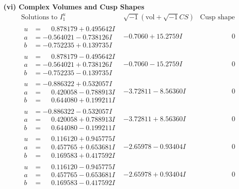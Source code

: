 \documentclass[1p]{elsarticle_modified}
\theoremstyle{definition}
\newcommand{\I}{\sqrt{-1}}
\begin{document}
\newpage\flushleft \textbf{(vi) Complex Volumes and Cusp Shapes}
$$\begin{array}{c|c|c}  
\text{Solutions to }I^u_{1}& \I (\text{vol} + \sqrt{-1}CS) & \text{Cusp shape}\\
 \hline 
\begin{aligned}
u &= \phantom{-}0.878179 + 0.495642 I \\
a &= -0.564021 - 0.738126 I \\
b &= -0.752235 + 0.139735 I\end{aligned}
 & -0.7060 + 15.2759 I & \phantom{-0.000000 } 0 \\ \hline\begin{aligned}
u &= \phantom{-}0.878179 - 0.495642 I \\
a &= -0.564021 + 0.738126 I \\
b &= -0.752235 - 0.139735 I\end{aligned}
 & -0.7060 - 15.2759 I & \phantom{-0.000000 } 0 \\ \hline\begin{aligned}
u &= -0.886322 + 0.532057 I \\
a &= \phantom{-}0.420058 - 0.788913 I \\
b &= \phantom{-}0.644080 + 0.199211 I\end{aligned}
 & -3.72811 - 8.56360 I & \phantom{-0.000000 } 0 \\ \hline\begin{aligned}
u &= -0.886322 - 0.532057 I \\
a &= \phantom{-}0.420058 + 0.788913 I \\
b &= \phantom{-}0.644080 - 0.199211 I\end{aligned}
 & -3.72811 + 8.56360 I & \phantom{-0.000000 } 0 \\ \hline\begin{aligned}
u &= \phantom{-}0.116120 + 0.945775 I \\
a &= \phantom{-}0.457765 + 0.653681 I \\
b &= \phantom{-}0.169583 + 0.417592 I\end{aligned}
 & -2.65978 - 0.93404 I & \phantom{-0.000000 } 0 \\ \hline\begin{aligned}
u &= \phantom{-}0.116120 - 0.945775 I \\
a &= \phantom{-}0.457765 - 0.653681 I \\
b &= \phantom{-}0.169583 - 0.417592 I\end{aligned}
 & -2.65978 + 0.93404 I & \phantom{-0.000000 } 0 \\ \hline\begin{aligned}

\end{aligned}
\end{array}$$
\end{document}
